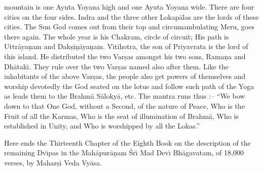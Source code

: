 mountain is one Ayuta Yoyana high and one Ayuta Yoyana wide. There are four cities on the four sides. Indra and the three other Lokap\=alas are the lords of these cities. The Sun God comes out from their top and circumambulating Meru, goes there again. The whole year is his Chakram, circle of circuit; His path is Uttr\=aya\d{n}am and Dak\d{s}i\d{n}\=aya\d{n}am. V\={\i}tihotra, the son of Priyavrata is the lord of this island. He distributed the two Var\d{s}as amongst his two sons, Rama\d{n}a and Dh\=atak\={\i}. They rule over the two Var\d{s}as named also after them. Like the inhabitants of the above Var\d{s}as, the people also get powers of themselves and worship devotedly the God seated on the lotus and follow such path of the Yoga as leads them to the Brahm\=a S\=aloky\=a, etc. The mantra runs thus :-- ``We bow down to that One God, without a Second, of the nature of Peace, Who is the Fruit of all the Karmas, Who is the seat of illumination of Brahm\=a, Who is established in Unity, and Who is worshipped by all the Lokas.''

Here ends the Thirteenth Chapter of the Eighth Book on the description of the remaining Dv\={\i}pas in the Mah\=apur\=a\d{n}am \'Sr\={\i} Mad Dev\={\i} Bh\=agavatam, of 18,000 verses, by Mahar\d{s}i Veda Vy\=asa.




